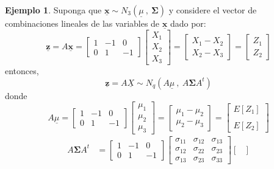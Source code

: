\documentclass[
]{book}
\theoremstyle{definition}
\theoremstyle{definition}
\newtheorem{example}{Ejemplo}[chapter]
\theoremstyle{definition}
\theoremstyle{definition}
\theoremstyle{remark}
\begin{document}
\begin{example}
\protect\hypertarget{exm:ejemplo1-prop-3}{}\label{exm:ejemplo1-prop-3}Suponga que \(\underline{\mathbf{x}}\sim N_3 (\underline{\mu} \ , \ \mathbf{\Sigma})\) y considere el vector de combinaciones lineales de las variables de \(\underline{\mathbf{x}}\) dado por:
\[
\underline{\mathbf{z}}=A\underline{\mathbf{x}}=\begin{bmatrix}
1 & -1 & 0 \\
0 & 1 & -1
\end{bmatrix}\begin{bmatrix}
X_1 \\ X_2\\ X_3
\end{bmatrix}=\begin{bmatrix}
X_1-X_2 \\ X_2 -X_3
\end{bmatrix}=\begin{bmatrix}
Z_1 \\Z_2
\end{bmatrix}
\]
entonces,
\[
\underline{\mathbf{z}}=A \underline{X}\sim N_q(A \underline{\mu}\ , \ A\mathbf{\Sigma} A^t )
\]
donde
\[
A\underline{\mu}=\begin{bmatrix}
1 & -1 & 0 \\
0 & 1 & -1
\end{bmatrix}\begin{bmatrix}
\mu_1 \\ \mu_2\\ \mu_3
\end{bmatrix}=\begin{bmatrix}
\mu_1-\mu_2 \\ \mu_2-\mu_3
\end{bmatrix}=\begin{bmatrix}
E[Z_1] \\ \\ E[Z_2]
\end{bmatrix}
\]
\begin{align*}
A\mathbf{\Sigma} A^t&= \begin{bmatrix}
1 & -1 & 0\\
0 & 1 & -1
\end{bmatrix}\begin{bmatrix}
\sigma_{11} & \sigma_{12} & \sigma_{13}\\
\sigma_{12} & \sigma_{22} & \sigma_{23}\\
\sigma_{13} &\sigma_{23} & \sigma_{33}
\end{bmatrix} \begin{bmatrix}

\end{bmatrix}
\end{align*}
\end{example}
\end{document}
